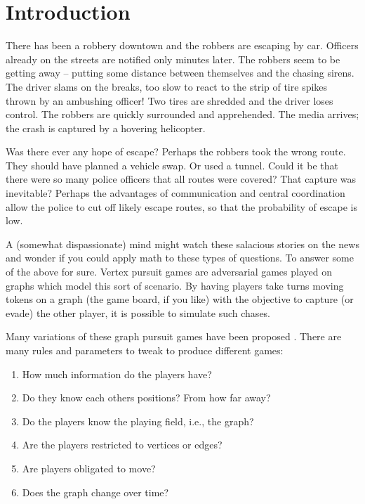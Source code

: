 \chapter{Introduction}\label{chapter intro}

There has been a robbery downtown and the robbers are escaping by car. Officers
already on the streets are notified only minutes later. The robbers seem to be getting away -- putting some distance between themselves and the chasing sirens.
The driver slams on the breaks, too slow to react to the strip of tire spikes thrown by an ambushing officer! Two tires are shredded and the driver loses control. The robbers are quickly surrounded and apprehended. The media arrives; the crash is captured by a hovering helicopter.

Was there ever any hope of escape? Perhaps the robbers took the wrong route.
They should have planned a vehicle swap. Or used a tunnel. Could it be that there were
so many police officers that all routes were covered? That capture was inevitable?
Perhaps the advantages of communication and central coordination allow the police to
  cut off likely escape routes, so that the probability of escape is low.

A (somewhat dispassionate) mind might watch these salacious stories on the news and wonder
 if you could apply math to these types of questions. To answer some of the above for sure.
Vertex pursuit games are adversarial games played on graphs which model this sort
of scenario.
By having players take turns moving tokens on a graph (the game board, if you like) with
the objective to capture (or evade) the other player, it is possible to simulate such chases.

Many variations of these graph pursuit games have been proposed \cite{bonato2017graph, bellman1967graphs}. There are many rules and parameters to tweak to produce different games:

\begin{enumerate}
\item How much information do the players have?
\item Do they know each others positions? From how far away?
\item Do the players know the playing field, i.e., the graph?
\item Are the players restricted to vertices or edges?
\item Are players obligated to move?
\item Does the graph change over time?
\end{enumerate}

